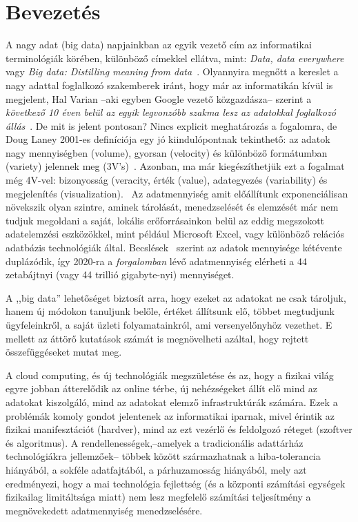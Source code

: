 \documentclass[a4paper,12pt]{article}
\author{Belényesi Roland}
\begin{document}
\tableofcontents
\newpage

\section{Bevezetés}
A nagy adat (big data) napjainkban az egyik vezető cím az informatikai terminológiák körében, különböző címekkel ellátva, mint: 
\textsl{Data, data everywhere}~\cite{economist} vagy 
\textsl{Big data: Distilling meaning from data}~\cite{nature}. Olyannyira megnőtt a kereslet a nagy adattal foglalkozó szakemberek iránt, hogy már az informatikán kívül is megjelent, Hal Varian --aki egyben Google vezető közgazdásza-- szerint a \textsl{következő 10 éven belül az egyik legvonzóbb szakma lesz az adatokkal foglalkozó állás}~\cite{varian}. De mit is jelent pontosan? Nincs explicit meghatározás a fogalomra, de Doug Laney 2001-es definíciója egy jó kiindulópontnak tekinthető: az adatok nagy mennyiségben (volume), gyorsan (velocity) és különböző formátumban (variety) jelennek meg (3V's)~\cite{3v}. Azonban, ma már kiegészíthetjük ezt a fogalmat még 4V-vel: bizonyosság (veracity, érték (value), adategyezés (variability) és megjelenítés (visualization).~\cite{7v} Az adatmennyiség amit előállítunk exponenciálisan növekszik olyan szintre, aminek tárolását, menedzselését és elemzését már nem tudjuk megoldani a saját, lokális erőforrásainkon belül az eddig megszokott adatelemzési eszközökkel, mint például Microsoft Excel, vagy különböző relációs adatbázis technológiák által.
Becslések~\cite{2020} szerint az adatok mennyisége kétévente duplázódik, így 2020-ra a \textsl{forgalomban} lévő adatmennyiség elérheti a 44 zetabájtnyi (vagy 44 trillió gigabyte-nyi) mennyiséget.
\newline

A ,,big data'' lehetőséget biztosít arra, hogy ezeket az adatokat ne csak tároljuk, hanem új módokon tanuljunk belőle, értéket állítsunk elő, többet megtudjunk ügyfeleinkről, a saját üzleti folyamatainkról, ami versenyelőnyhöz vezethet. E mellett az áttörő kutatások számát is megnövelheti azáltal, hogy rejtett összefüggéseket mutat meg.~\cite{brk} 

A cloud computing, és új technológiák megszületése és az, hogy a fizikai világ egyre jobban átterelődik az online térbe, új nehézségeket állít elő mind az adatokat kiszolgáló, mind az adatokat elemző infrastruktúrák számára. Ezek a problémák komoly gondot jelentenek az informatikai iparnak, mivel érintik az fizikai manifesztációt (hardver), mind az ezt vezérlő és feldolgozó réteget (szoftver és algoritmus). A rendellenességek,--amelyek a tradicionális adattárház technológiákra jellemzőek-- többek között származhatnak a hiba-tolerancia hiányából, a sokféle adatfajtából, a párhuzamosság hiányából, mely azt eredményezi, hogy a mai technológia fejlettség (és a központi számítási egységek fizikailag limitáltsága miatt) nem lesz megfelelő számítási teljesítmény a megnövekedett adatmennyiség menedzselésére.
\newpage
\end{document}
